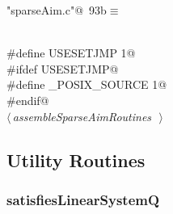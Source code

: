 \documentclass{article}
\begin{document}
\begin{flushleft} \small
\begin{minipage}{\linewidth}\label{scrap174}\raggedright\small
{} \verb@"sparseAim.c"@\nobreak\ {\footnotesize {93b}}$\equiv$
\vspace{-1ex}
\begin{list}{}{} \item
\mbox{}\verb@@\\
\mbox{}\verb@#define USESETJMP 1@\\
\mbox{}\verb@#ifdef USESETJMP@\\
\mbox{}\verb@#define _POSIX_SOURCE 1@\\
\mbox{}\verb@#endif@\\
\mbox{}\verb@@\hbox{$\langle\,${\itshape assembleSparseAimRoutines}\nobreak\ {\footnotesize {}}$\,\rangle$}\verb@@\\
\mbox{}\verb@@{\NWsep}
\end{list}
\vspace{-1.5ex}
\footnotesize
\begin{list}{}{\setlength{\itemsep}{-\parsep}\setlength{\itemindent}{-\leftmargin}}

\item{}
\end{list}
\end{minipage}\vspace{4ex}
\end{flushleft}
\subsection{Utility Routines}
\label{sec:util}

\subsubsection{satisfiesLinearSystemQ}
\end{document}
